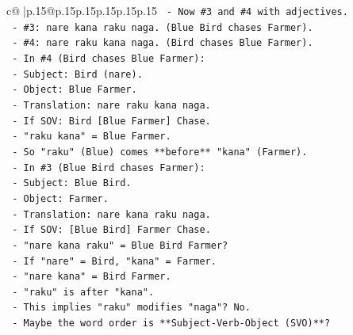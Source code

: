 \documentclass{article}
\begin{document}
{\begin{supertabular}{c@{$\;$}|p{.15\linewidth}@{}p{.15\linewidth}p{.15\linewidth}p{.15\linewidth}p{.15\linewidth}p{.15\linewidth}}
{{{\texttt{                                   {-} Now \#3 and \#4 with adjectives.} \\
\texttt{                                     {-} \#3: nare kana raku naga. (Blue Bird chases Farmer).} \\
\texttt{                                     {-} \#4: nare raku kana naga. (Bird chases Blue Farmer).} \\
\texttt{                                     {-} In \#4 (Bird chases Blue Farmer):} \\
\texttt{                                       {-} Subject: Bird (nare).} \\
\texttt{                                       {-} Object: Blue Farmer.} \\
\texttt{                                       {-} Translation: nare raku kana naga.} \\
\texttt{                                       {-} If SOV: Bird {[}Blue Farmer{]} Chase.} \\
\texttt{                                       {-} "raku kana" = Blue Farmer.} \\
\texttt{                                       {-} So "raku" (Blue) comes **before** "kana" (Farmer).} \\
\texttt{                                     {-} In \#3 (Blue Bird chases Farmer):} \\
\texttt{                                       {-} Subject: Blue Bird.} \\
\texttt{                                       {-} Object: Farmer.} \\
\texttt{                                       {-} Translation: nare kana raku naga.} \\
\texttt{                                       {-} If SOV: {[}Blue Bird{]} Farmer Chase.} \\
\texttt{                                       {-} "nare kana raku" = Blue Bird Farmer?} \\
\texttt{                                       {-} If "nare" = Bird, "kana" = Farmer.} \\
\texttt{                                       {-} "nare kana" = Bird Farmer.} \\
\texttt{                                       {-} "raku" is after "kana".} \\
\texttt{                                       {-} This implies "raku" modifies "naga"? No.} \\
\texttt{                                       {-} Maybe the word order is **Subject{-}Verb{-}Object (SVO)**?} \\
}}}
\end{supertabular}}
\end{document}
